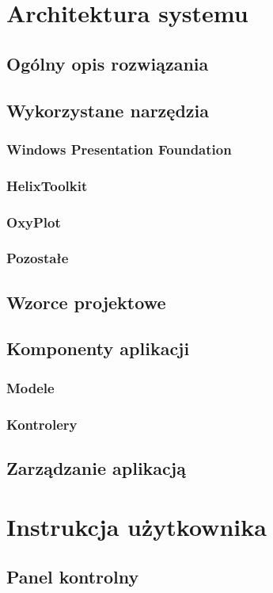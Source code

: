 \documentclass[12pt, oneside]{report}
\theoremstyle{definition}
\begin{document}
\chapter{Architektura systemu}
\section{Ogólny opis rozwiązania}
\section{Wykorzystane narzędzia}
\subsection{Windows Presentation Foundation}
\subsection{HelixToolkit}
\subsection{OxyPlot}
\subsection{Pozostałe}
\section{Wzorce projektowe}
\section{Komponenty aplikacji}
\subsection{Modele}
\subsection{Kontrolery}
\section{Zarządzanie aplikacją}


\chapter{Instrukcja użytkownika}
\section{Panel kontrolny}
\end{document}
